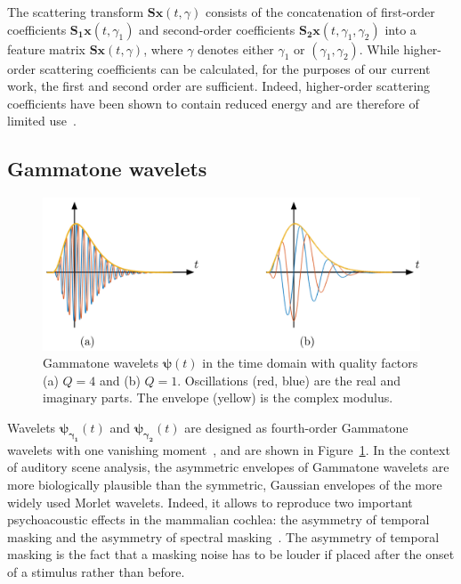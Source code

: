 \documentclass[smallextended]{svjour3}
\begin{document}
The scattering transform $\mathbf{S}\boldsymbol{x}(t,\gamma)$ consists of the concatenation of first-order coefficients $\mathbf{S_1}\boldsymbol{x}(t,\gamma_1)$ and second-order coefficients $\mathbf{S_2}\boldsymbol{x}(t,\gamma_1,\gamma_2)$ into a feature matrix $\mathbf{S}\boldsymbol{x}(t,\gamma)$, where $\gamma$ denotes either $\gamma_1$ or $(\gamma_1,\gamma_2)$. While higher-order scattering coefficients can be calculated, for the purposes of our current work, the first and second order are sufficient.
Indeed, higher-order scattering coefficients have been shown to contain reduced energy and are therefore of limited use~\cite{irene}.

\subsection{Gammatone wavelets}
\begin{figure}
\begin{center}
\includegraphics[width=\columnwidth]{figures/gammatones}
\caption{
\label{fig:gammatones}
Gammatone wavelets $\boldsymbol{\psi}(t)$ in the time domain with quality factors (a) $Q = 4$ and (b) $Q = 1$.
Oscillations (red, blue) are the real and imaginary parts. The envelope (yellow) is the complex modulus.}
\end{center}
\end{figure}
Wavelets
$\boldsymbol{\psi_{\gamma_1}}(t)$ and $\boldsymbol{\psi_{\gamma_2}}(t)$ are designed as fourth-order Gammatone
wavelets with one vanishing moment~\cite{Venkitaraman2014}, and are shown in Figure~\ref{fig:gammatones}.
In the context of auditory scene analysis, the asymmetric envelopes of Gammatone wavelets are more biologically plausible than the symmetric, Gaussian envelopes of the more widely used Morlet wavelets.
Indeed, it allows to reproduce two important psychoacoustic effects in the mammalian cochlea: the asymmetry of temporal masking and the asymmetry of spectral masking~\cite{Fastl2007}.
The asymmetry of temporal masking is the fact that a masking noise has to be louder if placed after the onset of a stimulus rather than before.
\end{document}
